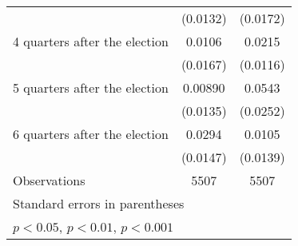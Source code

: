 \begin{table}[htbp]
\begin{tabular}{l*{2}{c}}
                    &    (0.0132)         &    (0.0172)         \\
[1em]
 4 quarters after the election&      0.0106         &      0.0215         \\
                    &    (0.0167)         &    (0.0116)         \\
[1em]
 5 quarters after the election&     0.00890         &      0.0543\sym{*}  \\
                    &    (0.0135)         &    (0.0252)         \\
[1em]
 6 quarters after the election&      0.0294\sym{*}  &      0.0105         \\
                    &    (0.0147)         &    (0.0139)         \\
\hline
Observations        &        5507         &        5507         \\
\hline\hline
\multicolumn{3}{l}{\footnotesize Standard errors in parentheses}\\
\multicolumn{3}{l}{\footnotesize \sym{*} \(p<0.05\), \sym{**} \(p<0.01\), \sym{***} \(p<0.001\)}\\
\end{tabular}
\end{table}

